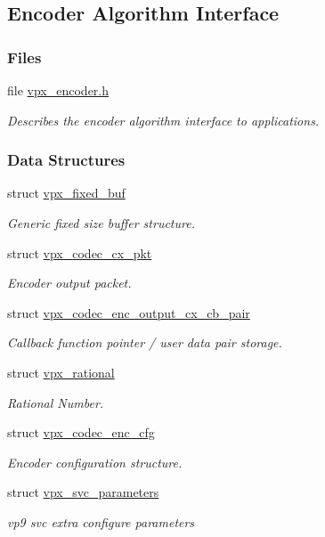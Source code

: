 \hypertarget{group__encoder}{}\subsection{Encoder Algorithm Interface}
\label{group__encoder}
\subsubsection*{Files}
\begin{DoxyCompactItemize}
\item 
file \hyperlink{vpx__encoder_8h}{vpx\+\_\+encoder.\+h}
\begin{DoxyCompactList}\small\item\em Describes the encoder algorithm interface to applications. \end{DoxyCompactList}\end{DoxyCompactItemize}
\subsubsection*{Data Structures}
\begin{DoxyCompactItemize}
\item 
struct \hyperlink{structvpx__fixed__buf}{vpx\+\_\+fixed\+\_\+buf}
\begin{DoxyCompactList}\small\item\em Generic fixed size buffer structure. \end{DoxyCompactList}\item 
struct \hyperlink{structvpx__codec__cx__pkt}{vpx\+\_\+codec\+\_\+cx\+\_\+pkt}
\begin{DoxyCompactList}\small\item\em Encoder output packet. \end{DoxyCompactList}\item 
struct \hyperlink{structvpx__codec__enc__output__cx__cb__pair}{vpx\+\_\+codec\+\_\+enc\+\_\+output\+\_\+cx\+\_\+cb\+\_\+pair}
\begin{DoxyCompactList}\small\item\em Callback function pointer / user data pair storage. \end{DoxyCompactList}\item 
struct \hyperlink{structvpx__rational}{vpx\+\_\+rational}
\begin{DoxyCompactList}\small\item\em Rational Number. \end{DoxyCompactList}\item 
struct \hyperlink{structvpx__codec__enc__cfg}{vpx\+\_\+codec\+\_\+enc\+\_\+cfg}
\begin{DoxyCompactList}\small\item\em Encoder configuration structure. \end{DoxyCompactList}\item 
struct \hyperlink{structvpx__svc__parameters}{vpx\+\_\+svc\+\_\+parameters}
\begin{DoxyCompactList}\small\item\em vp9 svc extra configure parameters \end{DoxyCompactList}\end{DoxyCompactItemize}
